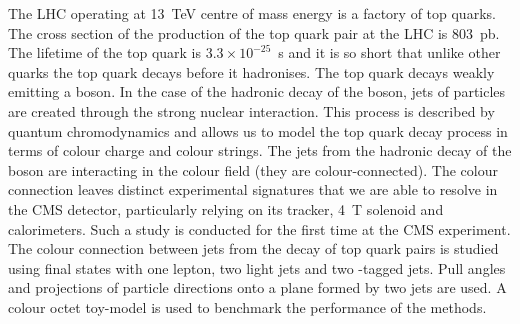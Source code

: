 The LHC operating at 13~TeV centre of mass energy is a factory of top quarks. The cross section of the production of the top quark pair at the LHC is 803~pb. The lifetime of the top quark is $3.3\times10^{-25}$~s and it is so short that unlike other quarks the top quark decays before it hadronises. The top quark decays weakly emitting a \PW boson. In the case of the hadronic decay of the \PW boson, jets of particles are created through the strong nuclear interaction. This process is described by quantum chromodynamics and allows us to model the top quark decay process in terms of colour charge and colour strings. The jets from the hadronic decay of the \PW boson are interacting in the colour field (they are colour-connected). The colour connection leaves distinct experimental signatures that we are able to resolve in the CMS detector, particularly relying on its tracker, 4~T solenoid and calorimeters. Such a study is conducted for the first time at the CMS experiment. The colour connection between jets from the decay of top quark pairs is studied using final states with one lepton, two light jets and two \cPqb-tagged jets. Pull angles and projections of particle directions onto a plane formed by two jets are used. A colour octet \PW toy-model is used to benchmark the performance of the methods.

